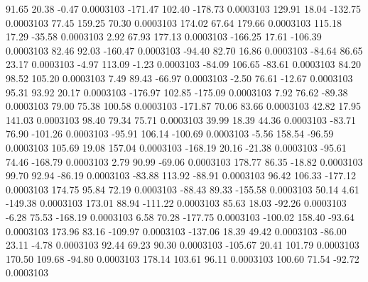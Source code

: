        91.65       20.38       -0.47     0.0003103
     -171.47      102.40     -178.73     0.0003103
      129.91       18.04     -132.75     0.0003103
       77.45      159.25       70.30     0.0003103
      174.02       67.64      179.66     0.0003103
      115.18       17.29      -35.58     0.0003103
        2.92       67.93      177.13     0.0003103
     -166.25       17.61     -106.39     0.0003103
       82.46       92.03     -160.47     0.0003103
      -94.40       82.70       16.86     0.0003103
      -84.64       86.65       23.17     0.0003103
       -4.97      113.09       -1.23     0.0003103
      -84.09      106.65      -83.61     0.0003103
       84.20       98.52      105.20     0.0003103
        7.49       89.43      -66.97     0.0003103
       -2.50       76.61      -12.67     0.0003103
       95.31       93.92       20.17     0.0003103
     -176.97      102.85     -175.09     0.0003103
        7.92       76.62      -89.38     0.0003103
       79.00       75.38      100.58     0.0003103
     -171.87       70.06       83.66     0.0003103
       42.82       17.95      141.03     0.0003103
       98.40       79.34       75.71     0.0003103
       39.99       18.39       44.36     0.0003103
      -83.71       76.90     -101.26     0.0003103
      -95.91      106.14     -100.69     0.0003103
       -5.56      158.54      -96.59     0.0003103
      105.69       19.08      157.04     0.0003103
     -168.19       20.16      -21.38     0.0003103
      -95.61       74.46     -168.79     0.0003103
        2.79       90.99      -69.06     0.0003103
      178.77       86.35      -18.82     0.0003103
       99.70       92.94      -86.19     0.0003103
      -83.88      113.92      -88.91     0.0003103
       96.42      106.33     -177.12     0.0003103
      174.75       95.84       72.19     0.0003103
      -88.43       89.33     -155.58     0.0003103
       50.14        4.61     -149.38     0.0003103
      173.01       88.94     -111.22     0.0003103
       85.63       18.03      -92.26     0.0003103
       -6.28       75.53     -168.19     0.0003103
        6.58       70.28     -177.75     0.0003103
     -100.02      158.40      -93.64     0.0003103
      173.96       83.16     -109.97     0.0003103
     -137.06       18.39       49.42     0.0003103
      -86.00       23.11       -4.78     0.0003103
       92.44       69.23       90.30     0.0003103
     -105.67       20.41      101.79     0.0003103
      170.50      109.68      -94.80     0.0003103
      178.14      103.61       96.11     0.0003103
      100.60       71.54      -92.72     0.0003103
